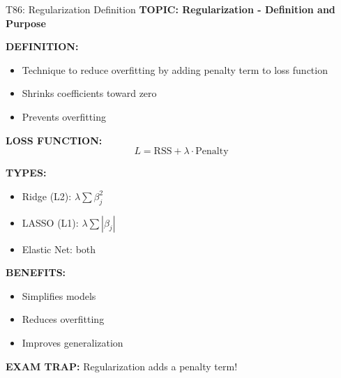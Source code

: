 \documentclass[8pt]{beamer}
\begin{document}
	\begin{frame}{T86: Regularization Definition}
		\fontsize{6.5}{7.5}\selectfont
		\textbf{TOPIC: Regularization - Definition and Purpose}
		
		\vspace{0.1cm}
		\textbf{DEFINITION:}
		\begin{itemize}
			\item Technique to reduce overfitting by adding penalty term to loss function
			\item Shrinks coefficients toward zero
			\item Prevents overfitting
		\end{itemize}
		
		\vspace{0.1cm}
		\textbf{LOSS FUNCTION:}
		\[
		L = \text{RSS} + \lambda \cdot \text{Penalty}
		\]
		
		\vspace{0.1cm}
		\textbf{TYPES:}
		\begin{itemize}
			\item \textcolor{myblue}{Ridge (L2):} $\lambda \sum \beta_j^2$
			\item \textcolor{myblue}{LASSO (L1):} $\lambda \sum |\beta_j|$
			\item \textcolor{myblue}{Elastic Net:} both
		\end{itemize}
		
		\vspace{0.1cm}
		\textbf{BENEFITS:}
		\begin{itemize}
			\item Simplifies models
			\item Reduces overfitting
			\item Improves generalization
		\end{itemize}
		
		\textcolor{myred}{\textbf{EXAM TRAP:}} Regularization adds a \textcolor{myblue}{penalty term}!
	\end{frame}
	
\end{document}

